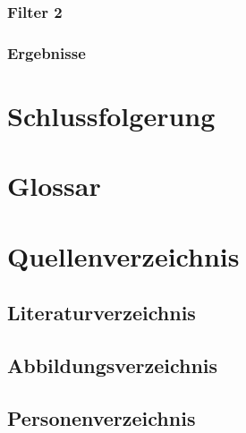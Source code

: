 \documentclass[12pt,a4paper, ngerman]{article}
\begin{document}
\subsubsection{Filter 2}

\subsubsection{Ergebnisse}

\section{Schlussfolgerung}




\newpage
\section{Glossar}


\newpage
\section{Quellenverzeichnis}
\subsection{Literaturverzeichnis}
\printbibliography
\subsection{Abbildungsverzeichnis}
\listoffigures
\subsection{Personenverzeichnis}
\end{document}

